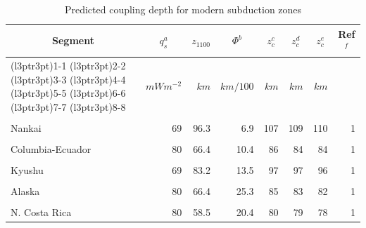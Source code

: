 \documentclass[draft,linenumbers]{agujournal2018}
\begin{document}
\begin{table}

\caption{\label{tab:segs}Predicted coupling depth for modern subduction zones}
\centering
\fontsize{8}{10}\selectfont
\begin{tabular}[t]{lrrrrrrr}
\toprule
\multicolumn{1}{c}{Segment} & \multicolumn{1}{c}{$q_s^a$} & \multicolumn{1}{c}{$z_{1100}$} & \multicolumn{1}{c}{$\Phi^b$} & \multicolumn{1}{c}{$z_c^c$} & \multicolumn{1}{c}{$z_c^d$} & \multicolumn{1}{c}{$z_c^e$} & \multicolumn{1}{c}{Ref$^f$} \\
\cmidrule(l{3pt}r{3pt}){1-1} \cmidrule(l{3pt}r{3pt}){2-2} \cmidrule(l{3pt}r{3pt}){3-3} \cmidrule(l{3pt}r{3pt}){4-4} \cmidrule(l{3pt}r{3pt}){5-5} \cmidrule(l{3pt}r{3pt}){6-6} \cmidrule(l{3pt}r{3pt}){7-7} \cmidrule(l{3pt}r{3pt}){8-8}
 & $mWm^{-2}$ & $km$ & $km/100$ & $km$ & $km$ & $km$ & \\
\midrule
\cellcolor{gray!6}{N. Cascadia} & \cellcolor{gray!6}{75} & \cellcolor{gray!6}{74.2} & \cellcolor{gray!6}{3.4} & \cellcolor{gray!6}{92} & \cellcolor{gray!6}{91} & \cellcolor{gray!6}{90} & \cellcolor{gray!6}{1}\\
Nankai & 69 & 96.3 & 6.9 & 107 & 109 & 110 & 1\\
\cellcolor{gray!6}{Mexico} & \cellcolor{gray!6}{72} & \cellcolor{gray!6}{98.1} & \cellcolor{gray!6}{7.2} & \cellcolor{gray!6}{108} & \cellcolor{gray!6}{111} & \cellcolor{gray!6}{112} & \cellcolor{gray!6}{1}\\
Columbia-Ecuador & 80 & 66.4 & 10.4 & 86 & 84 & 84 & 1\\
\cellcolor{gray!6}{S.C. Chile} & \cellcolor{gray!6}{80} & \cellcolor{gray!6}{66.4} & \cellcolor{gray!6}{20.0} & \cellcolor{gray!6}{85} & \cellcolor{gray!6}{84} & \cellcolor{gray!6}{83} & \cellcolor{gray!6}{1}\\
\addlinespace
Kyushu & 69 & 83.2 & 13.5 & 97 & 97 & 96 & 1\\
\cellcolor{gray!6}{N. Sumatra} & \cellcolor{gray!6}{120} & \cellcolor{gray!6}{26.8} & \cellcolor{gray!6}{25.0} & \cellcolor{gray!6}{57} & \cellcolor{gray!6}{65} & \cellcolor{gray!6}{68} & \cellcolor{gray!6}{2}\\
Alaska & 80 & 66.4 & 25.3 & 85 & 83 & 82 & 1\\
\cellcolor{gray!6}{N. Chile} & \cellcolor{gray!6}{85} & \cellcolor{gray!6}{58.7} & \cellcolor{gray!6}{38.4} & \cellcolor{gray!6}{78} & \cellcolor{gray!6}{77} & \cellcolor{gray!6}{77} & \cellcolor{gray!6}{1}\\
N. Costa Rica & 80 & 58.5 & 20.4 & 80 & 79 & 78 & 1\\

\end{tabular}
\end{table}
\end{document}
